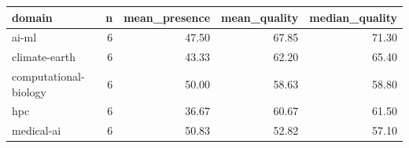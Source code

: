 \begin{tabular}{lrrrr}
\toprule
domain & n & mean_presence & mean_quality & median_quality \\
\midrule
ai-ml & 6 & 47.50 & 67.85 & 71.30 \\
climate-earth & 6 & 43.33 & 62.20 & 65.40 \\
computational-biology & 6 & 50.00 & 58.63 & 58.80 \\
hpc & 6 & 36.67 & 60.67 & 61.50 \\
medical-ai & 6 & 50.83 & 52.82 & 57.10 \\
\bottomrule
\end{tabular}
